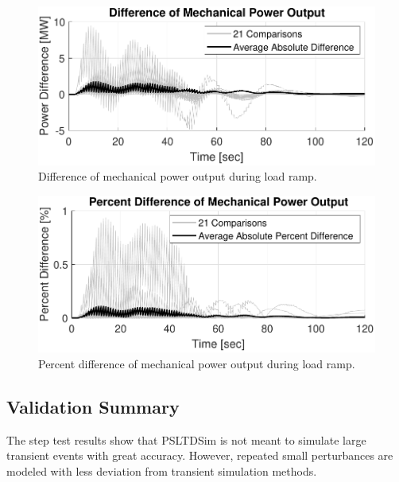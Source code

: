 \begin{figure}[!ht]
	\centering
	\includegraphics[width=\linewidth]{figures/miniWECC3ALTDrampPm2}
	\caption{Difference of mechanical power output during load ramp.}
	\label{fig: rampPmdif}
\end{figure}

\begin{figure}[!ht]
	\centering
	\includegraphics[width=\linewidth]{figures/miniWECC3ALTDrampPm3}
	\caption{Percent difference of mechanical power output during load ramp.}
	\label{fig: rampPmPercentdif}
\end{figure}
\subsection{Validation Summary}
The step test results show that PSLTDSim is not meant to simulate large transient events with great accuracy.
However, repeated small perturbances are modeled with less deviation from transient simulation methods.